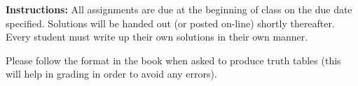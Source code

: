\documentclass[12pt]{exam}
\begin{document}
\extrawidth{0.5in}
\extrafootheight{-0.75in}
\pagestyle{headandfoot}
\headrule
{}
\footrule
{}

\addpoints

\noindent \textbf{Instructions:} All assignments are due at the
beginning of class on the due date specified.  Solutions will be
handed out (or posted on-line) shortly thereafter.  Every student
must write up their own solutions in their own manner.

\noindent Please follow the format in the book when asked to produce
truth tables (this will help in grading in order to avoid any
errors).

\end{document}
